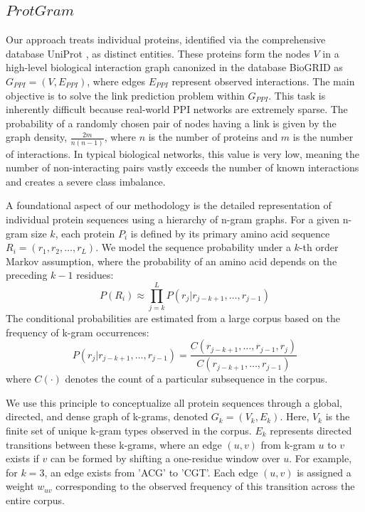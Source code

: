 \documentclass[utf8]{FrontiersinHarvard}
\begin{document}
	\subsection{$ProtGram$}
	Our approach treats individual proteins, identified via the comprehensive database UniProt \cite{theuniprotconsortium_uniprotuniversalprotein_2023}, as distinct entities. These proteins form the nodes $V$ in a high-level biological interaction graph canonized in the database BioGRID \cite{oughtred_biogriddatabasecomprehensive_2021} as $G_{PPI}=(V,E_{PPI})$, where edges $E_{PPI}$ represent observed interactions. The main objective is to solve the link prediction problem within $G_{PPI}$. This task is inherently difficult because real-world PPI networks are extremely sparse. The probability of a randomly chosen pair of nodes having a link is given by the graph density, $\frac{2m}{n(n-1)}$, where $n$ is the number of proteins and $m$ is the number of interactions. In typical biological networks, this value is very low, meaning the number of non-interacting pairs vastly exceeds the number of known interactions and creates a severe class imbalance.
	
	A foundational aspect of our methodology is the detailed representation of individual protein sequences using a hierarchy of n-gram graphs. For a given n-gram size $k$, each protein $P_i$ is defined by its primary amino acid sequence $R_i = (r_1, r_2, \ldots, r_L)$. We model the sequence probability under a $k$-th order Markov assumption, where the probability of an amino acid depends on the preceding $k-1$ residues:
	$$ P(R_i) \approx \prod_{j=k}^{L} P(r_j | r_{j-k+1}, \dots, r_{j-1}) $$
	The conditional probabilities are estimated from a large corpus based on the frequency of k-gram occurrences:
	$$ P(r_j | r_{j-k+1}, \dots, r_{j-1}) = \frac{C(r_{j-k+1}, \dots, r_{j-1}, r_j)}{C(r_{j-k+1}, \dots, r_{j-1})} $$
	where $C(\cdot)$ denotes the count of a particular subsequence in the corpus.
	
	We use this principle to conceptualize all protein sequences through a global, directed, and dense graph of k-grams, denoted $G_{k}=(V_{k}, E_{k})$. Here, $V_{k}$ is the finite set of unique k-gram types observed in the corpus. $E_{k}$ represents directed transitions between these k-grams, where an edge $(u, v)$ from k-gram $u$ to $v$ exists if $v$ can be formed by shifting a one-residue window over $u$. For example, for $k=3$, an edge exists from 'ACG' to 'CGT'. Each edge $(u, v)$ is assigned a weight $w_{uv}$ corresponding to the observed frequency of this transition across the entire corpus.
	
\end{document}
